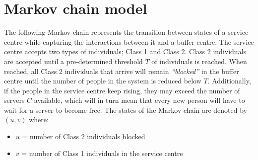 \section{Markov chain model}
The following Markov chain represents the transition between states of a service
centre 
while capturing the interactions between it and a buffer centre.
The service centre accepts two types of individuals; Class 1 and Class 2.  
Class 2 individuals are accepted until a pre-determined threshold \(T\) of 
individuals is reached.
When reached, all Class 2 individuals that arrive will remain \textit{``blocked''}
in the buffer centre until the number of people in the system is 
reduced below \(T\). 
Additionally, if the people in the service centre keep rising, they may exceed
the number 
of servers \(C\) available, which will in turn mean that every new person will 
have to wait for a server to become free. 
The states of the Markov chain are denoted by \((u,v)\) where:

\begin{itemize}
    \item \(u\) = number of Class 2 individuals blocked
    \item \(v\) = number of Class 1 individuals in the service centre
\end{itemize}

